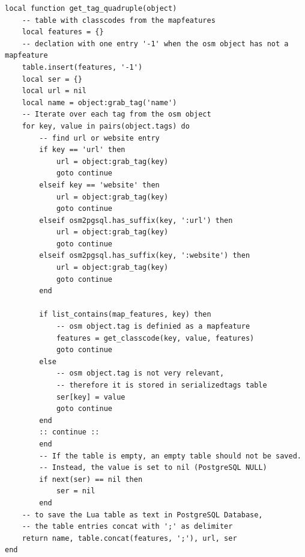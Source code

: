 \newpage\begin{lstlisting}[language={[5.0]Lua}, caption={Hilfsfunktion zur osm object.tag Verarbeitung},label={lst:get-quadruple}]
	local function get_tag_quadruple(object)
	-- table with classcodes from the mapfeatures
	local features = {}
	-- declation with one entry '-1' when the osm object has not a mapfeature
	table.insert(features, '-1')
	local ser = {}
	local url = nil
	local name = object:grab_tag('name')
	-- Iterate over each tag from the osm object
	for key, value in pairs(object.tags) do
		-- find url or website entry
		if key == 'url' then
			url = object:grab_tag(key)
			goto continue
		elseif key == 'website' then
			url = object:grab_tag(key)
			goto continue
		elseif osm2pgsql.has_suffix(key, ':url') then
			url = object:grab_tag(key)
			goto continue
		elseif osm2pgsql.has_suffix(key, ':website') then
			url = object:grab_tag(key)
			goto continue
		end
	
		if list_contains(map_features, key) then
			-- osm object.tag is definied as a mapfeature
			features = get_classcode(key, value, features)
			goto continue
		else
			-- osm object.tag is not very relevant,
			-- therefore it is stored in serializedtags table
			ser[key] = value
			goto continue
		end
		:: continue ::
		end
		-- If the table is empty, an empty table should not be saved.
		-- Instead, the value is set to nil (PostgreSQL NULL)
		if next(ser) == nil then
			ser = nil
		end
	-- to save the Lua table as text in PostgreSQL Database,
	-- the table entries concat with ';' as delimiter
	return name, table.concat(features, ';'), url, ser
end
\end{lstlisting}

\newpage
